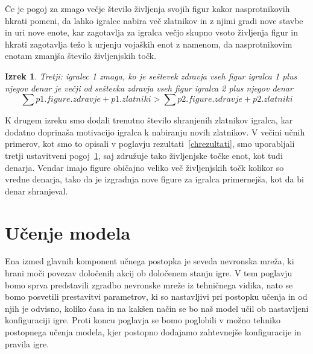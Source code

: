 \documentclass[a4paper, 12pt]{book}
\newtheorem{izrek}{Izrek}[chapter]
\begin{document}
Če je pogoj za zmago večje število življenja svojih figur kakor nasprotnikovih hkrati pomeni, da lahko igralec nabira več zlatnikov in z njimi gradi nove stavbe in uri nove enote, kar zagotavlja za igralca večjo skupno vsoto življenja figur in hkrati zagotavlja težo k urjenju vojaških enot z namenom, da nasprotnikovim enotam zmanjša število življenjskih točk.

\begin{izrek}
	\label{ustavitvenipogoj3}
Tretji: igralec 1 zmaga, ko je seštevek zdravja vseh figur igralca 1 plus njegov denar je večji od seštevka zdravja vseh figur igralca 2 plus njegov denar
	\begin{equation}
	\sum{p1.figure.zdravje} + p1.zlatniki > \sum{p2.figure.zdravje} + p2.zlatniki
	\label{eq:ustavitvenipogoj3}
	\end{equation}
\end{izrek}

K drugem izreku smo dodali trenutno število shranjenih zlatnikov igralca, kar dodatno doprinaša motivacijo igralca k nabiranju novih zlatnikov.
V večini učnih primerov, kot smo to opisali v poglavju rezultati~\ref{chrezultati}, smo uporabljali tretji ustavitveni pogoj~\ref{ustavitvenipogoj3}, saj združuje tako življenjske točke enot, kot tudi denarja.
Vendar imajo figure običajno veliko več življenjskih točk kolikor so vredne denarja, tako da je izgradnja nove figure za igralca primernejša, kot da bi denar shranjeval.


\chapter{Učenje modela}
\label{chucenjemodela}
Ena izmed glavnih komponent učnega postopka je seveda nevronska mreža, ki hrani moči povezav določenih akcij ob določenem stanju igre.
V tem poglavju bomo sprva predstavili zgradbo nevronske mreže iz tehničnega vidika, nato se bomo posvetili prestavitvi parametrov, ki so nastavljivi pri postopku učenja in od njih je odvisno, koliko časa in na kakšen način se bo naš model učil ob nastavljeni konfiguraciji igre.
Proti koncu poglavja se bomo poglobili v možno tehniko postopnega učenja modela, kjer postopno dodajamo zahtevnejše konfiguracije in pravila igre.
\end{document}
